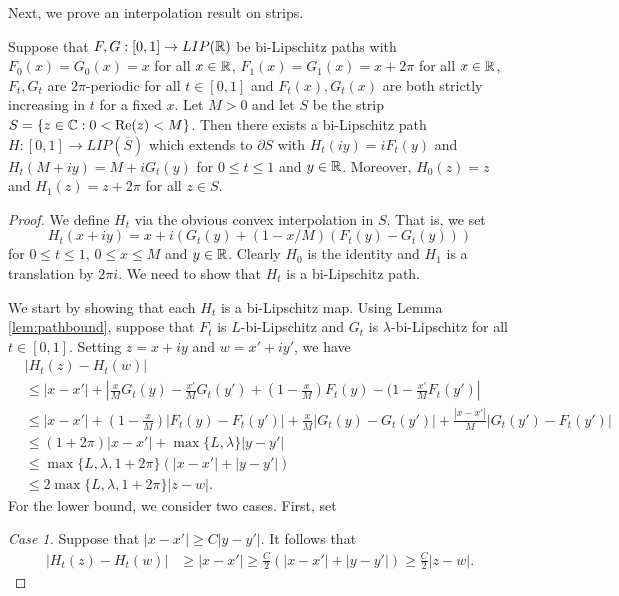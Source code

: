 \documentclass{amsart}
\begin{document}
Next, we prove an interpolation result on strips.

\begin{lemma}
\label{lemma:realpath}
Suppose that $F,G : [0,1] \to LIP(\mathbb{R})$ be bi-Lipschitz paths with $F_0 (x)= G_0(x) = x$ for all $x\in \mathbb{R}$, $F_1(x) = G_1(x) = x+2\pi$ for all $x\in \mathbb{R}$, $F_t,G_t$ are $2\pi$-periodic for all $t\in [0,1]$ and $F_t(x), G_t(x)$ are both strictly increasing in $t$ for a fixed $x$. Let $M>0$ and let $S$ be the strip $S=\{ z\in \mathbb{C}: 0< \operatorname{Re}(z) < M\}$. Then there exists a bi-Lipschitz path $H:[0,1] \to LIP(\overline{S})$ which extends to $\partial S$ with $H_t(iy) = iF_t(y)$ and $H_t(M+iy) = M+iG_t(y)$ for $0\leq t\leq 1$ and $y\in \mathbb{R}$. Moreover, $H_0(z) = z$ and $H_1(z) = z+2\pi$ for all $z\in S$.
\end{lemma}

\begin{proof}
We define $H_t$ via the obvious convex interpolation in $S$. That is, we set
\[H_t(x+iy) = x + i \left ( G_t(y) + ( 1- x/M) ( F_t(y) - G_t(y) ) \right ) \]
for $0\leq t\leq 1$, $0\leq x\leq M$ and $y\in \mathbb{R}$. Clearly $H_0$ is the identity and $H_1$ is a translation by $2\pi i$. We need to show that $H_t$ is a bi-Lipschitz path.

We start by showing that each $H_t$ is a bi-Lipschitz map. Using Lemma \ref{lem:pathbound}, suppose that $F_t$ is $L$-bi-Lipschitz and $G_t$ is $\lambda$-bi-Lipschitz for all $t\in [0,1]$. 
Setting $z=x+iy$ and $w=x'+iy'$, we have
\begin{align*}
&|H_t(z) -H_t(w)|\\ 
&\leq |x-x'| + \left | \tfrac{x}{M} G_t(y) - \tfrac{x'}{M} G_t(y') + (1-\tfrac{x}{M} ) F_t(y) - (1-\tfrac{x'}{M} F_t(y') \right | \\
&\leq |x-x'| +(1-\tfrac{x}{M} ) |F_t(y) - F_t(y')| + \tfrac{x}{M} | G_t(y) - G_t(y') | + \frac{|x-x'|}{M} |G_t(y') - F_t(y')|\\
&\leq (1+2\pi) |x-x'| + \max\{ L , \lambda \} |y-y'| \\
&\leq \max\{ L,\lambda, 1+2\pi \} ( |x-x'| + |y-y'| )\\
&\leq 2\max\{ L,\lambda, 1+2\pi \} |z-w|.
\end{align*}
For the lower bound, we consider two cases. First, set 

\emph{Case 1.} Suppose that $|x-x'| \geq C|y-y'|$. It follows that 
\begin{align*} 
|H_t(z) - H_t(w)| &\geq |x-x'| \geq \frac{C}{2} (|x-x'| + |y-y'|)\geq  \frac{C}{2} |z-w|.
\end{align*}


\end{proof}
\end{document}
